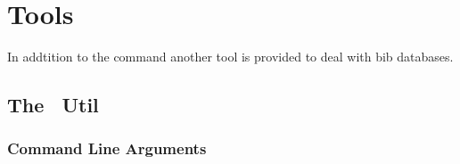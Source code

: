 
\chapter{Tools}

In addtition to the command  another tool is provided to
deal with bib databases.

\section{The \ExBib\ Util}

\INCOMPLETE


\subsection{Command Line Arguments}


\INCOMPLETE


\endinput
%
